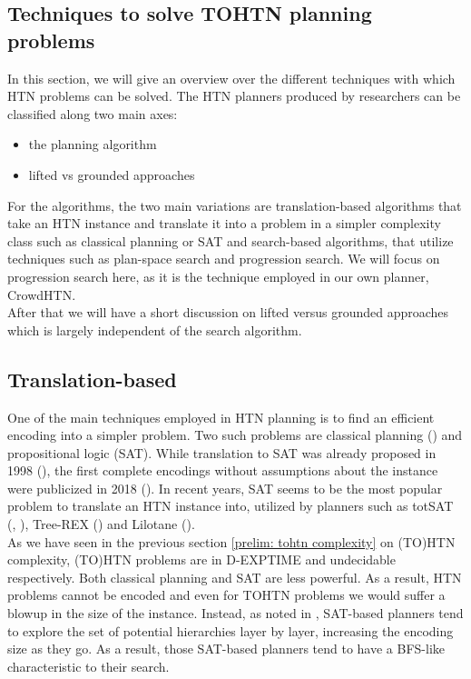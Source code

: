 \subsection{Techniques to solve TOHTN planning problems}
In this section, we will give an overview over the different techniques with which HTN problems can be solved. The HTN planners produced by researchers can be classified along two main axes:
\begin{itemize}
	\item the planning algorithm
	\item lifted vs grounded approaches
\end{itemize}
For the algorithms, the two main variations are translation-based algorithms that take an HTN instance and translate it into a problem in a simpler complexity class such as classical planning or SAT and search-based algorithms, that utilize techniques such as plan-space search and progression search. We will focus on progression search here, as it is the technique employed in our own planner, CrowdHTN. \\
After that we will have a short discussion on lifted versus grounded approaches which is largely independent of the search algorithm.
\begin{comment}
- multiple ways to solve HTN instances
- planners can be classified on two axis: the algorithm and lifted vs grounded
- in practise, most algorithms are based on translation to SAT or on search algorithms
- we will focus on search-based as we will see in later section \ref{prelim: crowdhtn} that this is what our own planner utilizes
\end{comment}

\subsection{Translation-based} 
One of the main techniques employed in HTN planning is to find an efficient encoding into a simpler problem. Two such problems are classical planning (\cite{alford2016bound}) and propositional logic (SAT). While translation to SAT was already proposed in 1998 (\cite{mali1998encoding}), the first complete encodings without assumptions about the instance were publicized in 2018 (\cite{behnke2018totsat}). In recent years, SAT seems to be the most popular problem to translate an HTN instance into, utilized by planners such as totSAT (\cite{behnke2018totsat}, \cite{behnke2018tracking}), Tree-REX (\cite{schreiber2019tree}) and Lilotane (\cite{schreiber2021lilotane}). \\
As we have seen in the previous section \ref{prelim: tohtn complexity} on (TO)HTN complexity, (TO)HTN problems are in D-EXPTIME and undecidable respectively. Both classical planning and SAT are less powerful. As a result, HTN problems cannot be encoded and even for TOHTN problems we would suffer a blowup in the size of the instance. Instead, as noted in \cite{schreiber2019tree}, SAT-based planners tend to explore the set of potential hierarchies layer by layer, increasing the encoding size as they go. As a result, those SAT-based planners tend to have a BFS-like characteristic to their search.

